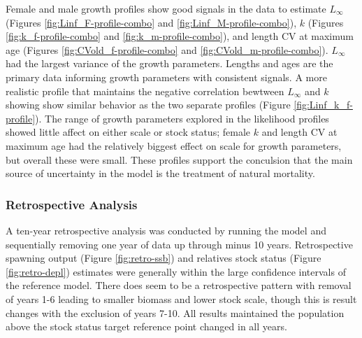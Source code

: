 \documentclass[11pt,
  english,
  a4paper,
]{article}
\begin{document}
Female and male growth profiles show good signals in the data to estimate {\(L_{\infty}\)\leavevmode\tagmcend\tagstructend} (Figures \ref{fig:Linf_F-profile-combo} and \ref{fig:Linf_M-profile-combo}), {\(k\)\leavevmode\tagmcend\tagstructend} (Figures \ref{fig:k_f-profile-combo} and \ref{fig:k_m-profile-combo}), and length CV at maximum age (Figures \ref{fig:CVold_f-profile-combo} and \ref{fig:CVold_m-profile-combo}). {\(L_{\infty}\)\leavevmode\tagmcend\tagstructend} had the largest variance of the growth parameters. Lengths and ages are the primary data informing growth parameters with consistent signals. A more realistic profile that maintains the negative correlation bewtween {\(L_{\infty}\)\leavevmode\tagmcend\tagstructend} and {\(k\)\leavevmode\tagmcend\tagstructend} showing show similar behavior as the two separate profiles (Figure \ref{fig:Linf_k_f-profile}). The range of growth parameters explored in the likelihood profiles showed little affect on either scale or stock status; female {\(k\)\leavevmode\tagmcend\tagstructend} and length CV at maximum age had the relatively biggest effect on scale for growth parameters, but overall these were small. These profiles support the conculsion that the main source of uncertainty in the model is the treatment of natural mortality.

\leavevmode\tagmcend\tagstructend\par


\hypertarget{retrospective-analysis}{%
\subsubsection{Retrospective Analysis}\label{retrospective-analysis}}

\leavevmode\tagmcend\tagstructend


A ten-year retrospective analysis was conducted by running the model and sequentially removing one year of data up through minus 10 years. Retrospective spawning output (Figure \ref{fig:retro-ssb}) and relatives stock status (Figure \ref{fig:retro-depl}) estimates were generally within the large confidence intervals of the reference model. There does seem to be a retrospective pattern with removal of years 1-6 leading to smaller biomass and lower stock scale, though this is result changes with the exclusion of years 7-10. All results maintained the population above the stock status target reference point changed in all years.
\end{document}
